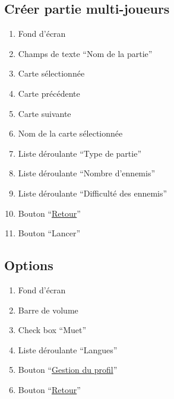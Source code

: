 \documentclass{report}
\begin{document}
\newpage

	\subsection{Créer partie multi-joueurs}
	
		\hypertarget{Creer partie multi-joueurs}{}
		\label{Creer partie multi-joueurs}
	
		
		
		\begin{enumerate}
		  \item Fond d'écran
		  \item Champs de texte ``Nom de la partie''
		  \item Carte sélectionnée
		  \item Carte précédente
		  \item Carte suivante
		  \item Nom de la carte sélectionnée
		  \item Liste déroulante ``Type de partie''
		  \item Liste déroulante ``Nombre d'ennemis''
		  \item Liste déroulante ``Difficulté des ennemis''
		  \item Bouton ``\hyperlink{Page d'accueil}{Retour}''
		  \item Bouton ``Lancer'' 
		\end{enumerate}
	
	
\newpage

	\subsection{Options}
	
		\hypertarget{Options}{}
		\label{Options}
	
		
		
		\begin{enumerate}
		  \item Fond d'écran
		  \item Barre de volume
		  \item Check box ``Muet''
		  \item Liste déroulante ``Langues''
		  \item Bouton ``\hyperlink{Page d'accueil}{Gestion du profil}''
		  \item Bouton ``\hyperlink{Page d'accueil}{Retour}''
		\end{enumerate}

	
\newpage
\end{document}
